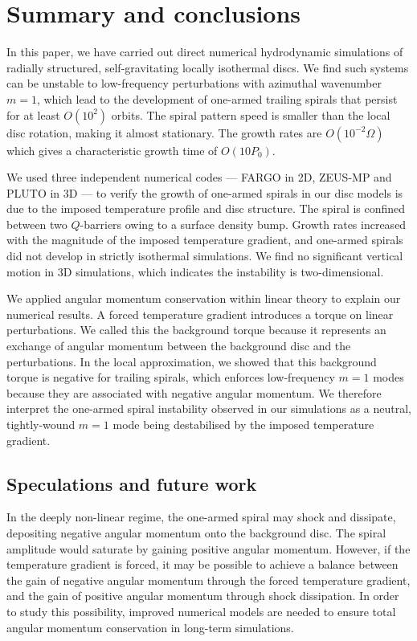 \section{Summary and conclusions}\label{summary}
In this paper, we have carried out direct numerical hydrodynamic
simulations of radially structured, self-gravitating locally
isothermal discs.     
We find such systems can be unstable to low-frequency perturbations
with azimuthal wavenumber $m=1$, which lead to the development of one-armed 
trailing spirals that persist for at least $O(10^2)$ orbits. The 
spiral pattern speed is smaller than the local disc rotation, making
it almost stationary. The growth rates are $O(10^{-2}\Omega)$ which
gives a characteristic growth time of $O(10P_0)$. 

We used three independent numerical codes --- FARGO in 2D, ZEUS-MP and
PLUTO in 3D --- to verify the growth of  
one-armed spirals in our disc models is due to the imposed temperature
profile and disc structure. The spiral is confined between two
$Q$-barriers owing to a surface density bump. Growth rates increased
with the magnitude of the imposed temperature gradient, and one-armed
spirals did not develop in strictly isothermal simulations.  
We find no significant vertical 
motion in 3D simulations, which indicates the instability is
two-dimensional. 

We applied angular momentum conservation within linear theory to
explain our numerical results. A  
forced temperature gradient introduces a torque on linear 
perturbations. We called this the background torque because it
represents an exchange of angular momentum between the background disc
and the perturbations. In the local approximation, we showed that this
background torque is negative for trailing spirals, which enforces  
low-frequency $m=1$ modes because they are associated with negative
angular momentum. We therefore interpret the one-armed spiral instability
observed in our simulations as a neutral, tightly-wound $m=1$ mode
being destabilised by the imposed temperature gradient.  

\subsection{Speculations and future work}
In the deeply non-linear regime, the one-armed spiral may 
shock and dissipate, depositing negative angular momentum onto
the background disc. The spiral amplitude would saturate by gaining
positive angular momentum. However, if the temperature gradient is
forced, it may be possible to achieve a balance between the gain of negative
angular momentum through the forced temperature gradient, and the gain
of positive angular momentum through shock dissipation. In order to
study this possibility, improved numerical models are needed to ensure 
total angular momentum conservation in long-term simulations.  


